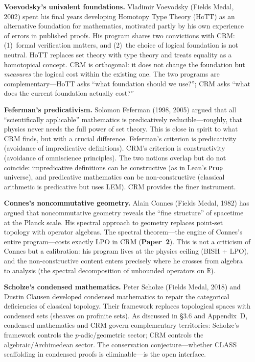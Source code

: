 \documentclass[11pt,twoside,openany]{report}
\theoremstyle{remark}
\newcommand{\BISH}{\textsf{BISH}}
\newcommand{\LPO}{\textsf{LPO}}
\newcommand{\CLASS}{\textsf{CLASS}}
\newcommand{\paperref}[1]{\textbf{Paper~#1}}
\begin{document}
\textbf{Voevodsky's univalent foundations.}
Vladimir Voevodsky (Fields Medal, 2002) spent his final years developing Homotopy Type Theory (HoTT) as an alternative foundation for mathematics, motivated partly by his own experience of errors in published proofs. His program shares two convictions with CRM: (1)~formal verification matters, and (2)~the choice of logical foundation is not neutral. HoTT replaces set theory with type theory and treats equality as a homotopical concept. CRM is orthogonal: it does not change the foundation but \emph{measures} the logical cost within the existing one. The two programs are complementary---HoTT asks ``what foundation should we use?''; CRM asks ``what does the current foundation actually cost?''

\textbf{Feferman's predicativism.}
Solomon Feferman (1998, 2005) argued that all ``scientifically applicable'' mathematics is predicatively reducible---roughly, that physics never needs the full power of set theory. This is close in spirit to what CRM finds, but with a crucial difference. Feferman's criterion is predicativity (avoidance of impredicative definitions). CRM's criterion is constructivity (avoidance of omniscience principles). The two notions overlap but do not coincide: impredicative definitions can be constructive (as in Lean's \texttt{Prop} universe), and predicative mathematics can be non-constructive (classical arithmetic is predicative but uses LEM). CRM provides the finer instrument.

\textbf{Connes's noncommutative geometry.}
Alain Connes (Fields Medal, 1982) has argued that noncommutative geometry reveals the ``fine structure'' of spacetime at the Planck scale. His spectral approach to geometry replaces point-set topology with operator algebras. The spectral theorem---the engine of Connes's entire program---costs exactly \LPO{} in CRM (\paperref{2}). This is not a criticism of Connes but a calibration: his program lives at the physics ceiling (\BISH{} + \LPO), and the non-constructive content enters precisely where he crosses from algebra to analysis (the spectral decomposition of unbounded operators on $\mathbb{R}$).

\textbf{Scholze's condensed mathematics.}
Peter Scholze (Fields Medal, 2018) and Dustin Clausen developed condensed mathematics to repair the categorical deficiencies of classical topology. Their framework replaces topological spaces with condensed sets (sheaves on profinite sets). As discussed in \S3.6 and Appendix~D, condensed mathematics and CRM govern complementary territories: Scholze's framework controls the $p$-adic/geometric sector; CRM controls the algebraic/Archimedean sector. The conservation conjecture---whether \CLASS{} scaffolding in condensed proofs is eliminable---is the open interface.
\end{document}
